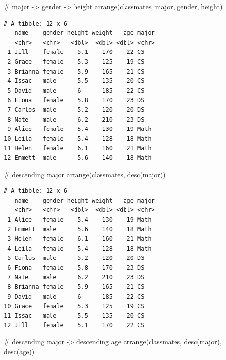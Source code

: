 \documentclass[
  letterpaper,
  DIV=11,
  numbers=noendperiod]{scrreprt}
\newenvironment{Shaded}{\begin{snugshade}}{\end{snugshade}}
\newcommand{\CommentTok}[1]{\textcolor[rgb]{0.37,0.37,0.37}{#1}}
\newcommand{\FunctionTok}[1]{\textcolor[rgb]{0.28,0.35,0.67}{#1}}
\newcommand{\NormalTok}[1]{\textcolor[rgb]{0.00,0.23,0.31}{#1}}
\begin{document}
\begin{tcolorbox}
\begin{Shaded}
\begin{Highlighting}[]
\CommentTok{\# major {-}\textgreater{} gender {-}\textgreater{} height}
\FunctionTok{arrange}\NormalTok{(classmates, major, gender, height)}
\end{Highlighting}
\end{Shaded}

\begin{verbatim}
# A tibble: 12 x 6
   name    gender height weight   age major
   <chr>   <chr>   <dbl>  <dbl> <dbl> <chr>
 1 Jill    female    5.1    170    22 CS   
 2 Grace   female    5.3    125    19 CS   
 3 Brianna female    5.9    165    21 CS   
 4 Issac   male      5.5    135    20 CS   
 5 David   male      6      185    22 CS   
 6 Fiona   female    5.8    170    23 DS   
 7 Carlos  male      5.2    120    20 DS   
 8 Nate    male      6.2    210    23 DS   
 9 Alice   female    5.4    130    19 Math 
10 Leila   female    5.4    128    18 Math 
11 Helen   female    6.1    160    21 Math 
12 Emmett  male      5.6    140    18 Math 
\end{verbatim}

\begin{Shaded}
\begin{Highlighting}[]
\CommentTok{\# descending major}
\FunctionTok{arrange}\NormalTok{(classmates, }\FunctionTok{desc}\NormalTok{(major))}
\end{Highlighting}
\end{Shaded}

\begin{verbatim}
# A tibble: 12 x 6
   name    gender height weight   age major
   <chr>   <chr>   <dbl>  <dbl> <dbl> <chr>
 1 Alice   female    5.4    130    19 Math 
 2 Emmett  male      5.6    140    18 Math 
 3 Helen   female    6.1    160    21 Math 
 4 Leila   female    5.4    128    18 Math 
 5 Carlos  male      5.2    120    20 DS   
 6 Fiona   female    5.8    170    23 DS   
 7 Nate    male      6.2    210    23 DS   
 8 Brianna female    5.9    165    21 CS   
 9 David   male      6      185    22 CS   
10 Grace   female    5.3    125    19 CS   
11 Issac   male      5.5    135    20 CS   
12 Jill    female    5.1    170    22 CS   
\end{verbatim}

\begin{Shaded}
\begin{Highlighting}[]
\CommentTok{\# descending major {-}\textgreater{} descending age}
\FunctionTok{arrange}\NormalTok{(classmates, }\FunctionTok{desc}\NormalTok{(major), }\FunctionTok{desc}\NormalTok{(age))}
\end{Highlighting}
\end{Shaded}


\end{tcolorbox}
\end{document}
